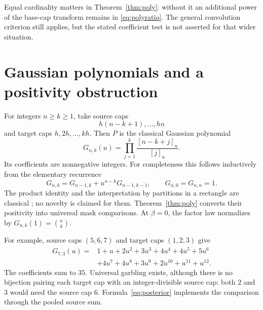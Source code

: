 \documentclass[11pt,a4paper]{article}
\theoremstyle{remark}\newtheorem*{ednote}{Editorial note (ProveIt, 2026-10-01)}
\begin{document}
Equal cardinality matters in Theorem~\ref{thm:poly}: without it an additional power of the base-cap transform remains in \eqref{eq:polyratio}. The general convolution criterion still applies, but the stated coefficient test is not asserted for that wider situation.

\section{Gaussian polynomials and a positivity obstruction}
For integers $n\ge k\ge1$, take source caps
\[
 h(n-k+1),\ldots,hn
\]
and target caps $h,2h,\ldots,kh$. Then $P$ is the classical Gaussian polynomial
\begin{equation}\label{eq:gaussian}
 G_{n,k}(u)=\prod_{j=1}^k\frac{[n-k+j]_u}{[j]_u}.
\end{equation}
Its coefficients are nonnegative integers. For completeness this follows inductively from the elementary recurrence
\[
 G_{n,k}=G_{n-1,k}+u^{n-k}G_{n-1,k-1},
 \qquad G_{n,0}=G_{n,n}=1.
\]
The product identity and the interpretation by partitions in a rectangle are classical \cite{DLMF,MPP}; no novelty is claimed for them. Theorem~\ref{thm:poly} converts their positivity into universal mask comparisons. At $\beta=0$, the factor law normalizes by $G_{n,k}(1)=\binom nk$.

For example, source caps $(5,6,7)$ and target caps $(1,2,3)$ give
\begin{align*}
 G_{7,3}(u)={}&1+u+2u^2+3u^3+4u^4+4u^5+5u^6\\
             &+4u^7+4u^8+3u^9+2u^{10}+u^{11}+u^{12}.
\end{align*}
The coefficients sum to $35$. Universal garbling exists, although there is no bijection pairing each target cap with an integer-divisible source cap: both $2$ and $3$ would need the source cap $6$. Formula~\eqref{eq:posterior} implements the comparison through the pooled source sum.
\end{document}
